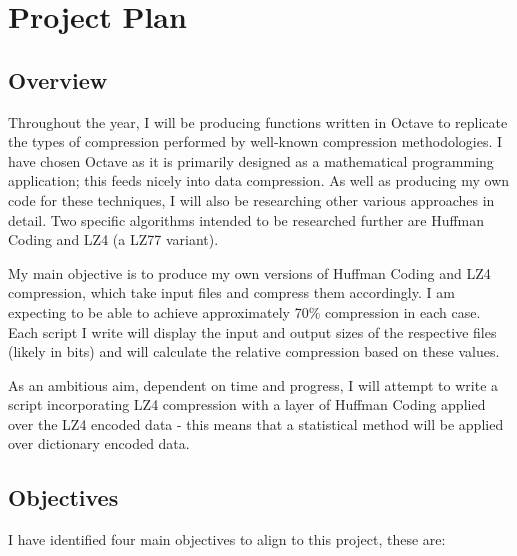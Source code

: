 \documentclass[12pt]{article}
\begin{document}
	\clearpage
	\section{Project Plan}
	\subsection{Overview}	
	Throughout the year, I will be producing functions written in Octave to replicate the types of compression performed by well-known compression methodologies.  I have chosen Octave as it is primarily designed as a mathematical programming application; this feeds nicely into data compression. As well as producing my own code for these techniques, I will also be researching other various approaches in detail. Two specific algorithms intended to be researched further are Huffman Coding and LZ4 (a LZ77 variant).
	
	My main objective is to produce my own versions of Huffman Coding and LZ4 compression, which take input files and compress them accordingly. I am expecting to be able to achieve approximately 70\% compression in each case. Each script I write will display the input and output sizes of the respective files (likely in bits) and will calculate the relative compression based on these values.
	
	As an ambitious aim, dependent on time and progress, I will attempt to write a script incorporating LZ4 compression with a layer of Huffman Coding applied over the LZ4 encoded data - this means that a statistical method will be applied over dictionary encoded data.
	
	\subsection{Objectives}
	I have identified four main objectives to align to this project, these are:
	
\end{document}
